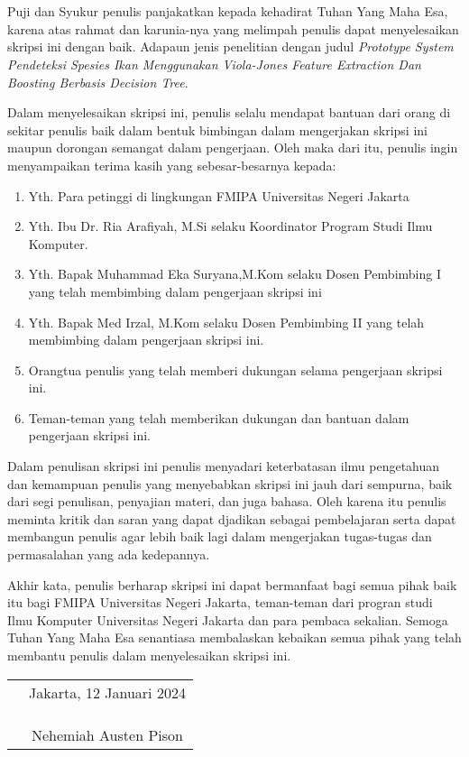 \chapter*{}

Puji dan Syukur penulis panjakatkan kepada kehadirat Tuhan Yang Maha Esa, 
karena atas rahmat dan karunia-nya yang melimpah penulis dapat menyelesaikan
 skripsi ini dengan baik. Adapaun jenis penelitian dengan judul 
\textit{Prototype System Pendeteksi Spesies Ikan Menggunakan 
Viola-Jones Feature Extraction Dan Boosting Berbasis Decision Tree}.

Dalam menyelesaikan skripsi ini, penulis selalu mendapat bantuan dari orang 
di sekitar penulis baik dalam bentuk bimbingan dalam mengerjakan skripsi 
ini maupun dorongan semangat dalam pengerjaan. Oleh maka dari itu, penulis 
ingin menyampaikan terima kasih yang sebesar-besarnya kepada:

\begin{enumerate}

	\item{Yth. Para petinggi di lingkungan FMIPA Universitas Negeri Jakarta}
	\item{Yth. Ibu Dr. Ria Arafiyah, M.Si selaku Koordinator Program Studi Ilmu
		Komputer.}
	\item{Yth. Bapak Muhammad Eka Suryana,M.Kom selaku Dosen Pembimbing I 
		yang telah membimbing dalam pengerjaan skripsi ini}
	\item{Yth. Bapak Med Irzal, M.Kom selaku Dosen Pembimbing II yang telah
		membimbing dalam pengerjaan skripsi ini.}
	\item{Orangtua penulis yang telah memberi dukungan selama pengerjaan
		 skripsi ini.}
	\item{Teman-teman yang telah memberikan dukungan dan bantuan dalam 
		pengerjaan skripsi ini.}
	
\end{enumerate}

Dalam penulisan skripsi ini penulis menyadari keterbatasan ilmu 
pengetahuan dan kemampuan penulis yang menyebabkan skripsi ini jauh dari 
sempurna, baik dari segi penulisan, penyajian materi, dan juga bahasa. Oleh 
karena itu penulis meminta kritik dan saran yang dapat djadikan sebagai 
pembelajaran serta dapat membangun penulis agar lebih baik lagi dalam mengerjakan 
tugas-tugas dan permasalahan yang ada kedepannya.

Akhir kata, penulis berharap skripsi ini dapat bermanfaat bagi semua 
pihak baik itu bagi FMIPA Universitas Negeri Jakarta, teman-teman dari progran 
studi Ilmu Komputer Universitas Negeri Jakarta dan para pembaca sekalian. 
Semoga Tuhan Yang Maha Esa senantiasa membalaskan kebaikan semua pihak yang 
telah membantu penulis dalam menyelesaikan skripsi ini.
\vspace{4cm}

\begin{tabular}{p{7.5cm}c}
	&Jakarta, 12 Januari 2024\\
	&\\
	&\\
	&\\
	&Nehemiah Austen Pison
\end{tabular}
